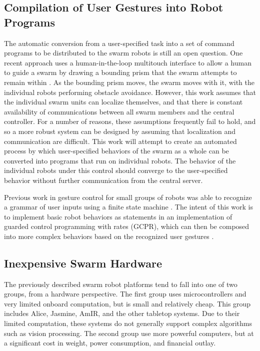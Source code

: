 \subsection{Compilation of User Gestures into Robot Programs} \label{section:Compilation_of_User_Gestures_into_Robot_Programs}
The automatic conversion from a user-specified task into a set of command programs to be distributed to the swarm robots is still an open question.
One recent approach uses a human-in-the-loop multitouch interface to allow a human to guide a swarm by drawing a bounding prism that the swarm attempts to remain within \citep{ayanian2014controlling}. 
As the bounding prism moves, the swarm moves with it, with the individual robots performing obstacle avoidance. 
However, this work assumes that the individual swarm units can localize themselves, and that there is constant availability of communications between all swarm members and the central controller. 
For a number of reasons, these assumptions frequently fail to hold, and so a more robust system can be designed by assuming that localization and communication are difficult. 
This work will attempt to create an automated process by which user-specified behaviors of the swarm as a whole can be converted into programs that run on individual robots. 
The behavior of the individual robots under this control should converge to the user-specified behavior without further communication from the central server.

Previous work in gesture control for small groups of robots was able to recognize a grammar of user inputs using a finite state machine \citep{micire2010multi}.
The intent of this work is to implement basic robot behaviors as statements in an implementation of guarded control programming with rates (GCPR), which can then be composed into more complex behaviors based on the recognized user gestures \citep{napp2011compositional}.  


\subsection{Inexpensive Swarm Hardware} \label{section:Inexpensive_Swarm_Hardware}

The previously described swarm robot platforms tend to fall into one of two groups, from a hardware perspective. 
The first group uses microcontrollers and very limited onboard computation, but is small and relatively cheap.
This group includes Alice, Jasmine, AmIR, and the other tabletop systems. 
Due to their limited computation, these systems do not generally support complex algorithms such as vision processing. 
The second group use more powerful computers, but at a significant cost in weight, power consumption, and financial outlay.


